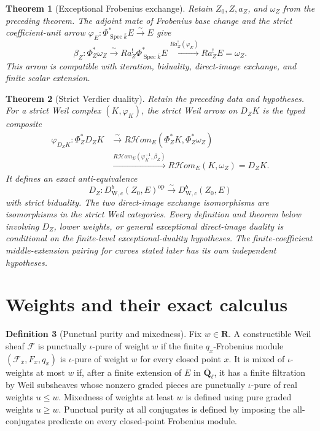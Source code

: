 \documentclass[10pt]{article}
\newtheorem{theorem}{Theorem}[section]
\theoremstyle{definition}
\newtheorem{definition}[theorem]{Definition}
\newcommand{\Qlb}{\overline{\mathbf Q}_\ell}
\newcommand{\DW}{D^b_{\mathrm W,c}}
\newcommand{\Spec}{\operatorname{Spec}}
\begin{document}
\begin{theorem}[Exceptional Frobenius exchange]
Retain \(Z_0,Z,a_Z\), and \(\omega_Z\) from the preceding theorem.  The
adjoint mate of Frobenius base change and
the strict coefficient-unit arrow
\(\varphi_E:\Phi_{\Spec\bar k}^*E\xrightarrow{\sim}E\) give
\[
 \beta_Z:\Phi_Z^*\omega_Z
 \xrightarrow{\sim}Ra_Z^!\Phi_{\Spec\bar k}^*E
 \xrightarrow{Ra_Z^!(\varphi_E)}Ra_Z^!E=\omega_Z.
\]
This arrow is compatible with iteration, biduality, direct-image exchange,
and finite scalar extension.
\end{theorem}

\begin{theorem}[Strict Verdier duality]
Retain the preceding data and hypotheses.  For a strict Weil
complex \((K,\varphi_K)\), the strict Weil arrow on \(D_ZK\) is the typed
composite
\[
\begin{aligned}
 \varphi_{D_ZK}:\Phi_Z^*D_ZK
 &\xrightarrow{\sim}
 R\mathcal Hom_E(\Phi_Z^*K,\Phi_Z^*\omega_Z)\\
 &\xrightarrow{R\mathcal Hom_E(\varphi_K^{-1},\beta_Z)}
 R\mathcal Hom_E(K,\omega_Z)=D_ZK.
\end{aligned}
\]
It defines an exact anti-equivalence
\[
 D_Z:\DW(Z_0,E)^{\mathrm{op}}\xrightarrow{\sim}\DW(Z_0,E)
\]
with strict biduality.  The two direct-image exchange isomorphisms are
isomorphisms in the strict Weil categories.  Every definition and theorem
below involving \(D_Z\), lower weights, or general exceptional direct-image
duality is conditional on the finite-level exceptional-duality hypotheses.
The finite-coefficient middle-extension pairing for curves stated later has
its own independent hypotheses.
\end{theorem}

\section{Weights and their exact calculus}

\begin{definition}[Punctual purity and mixedness]
Fix \(w\in\mathbf R\).  A constructible Weil sheaf \(\mathcal F\) is
punctually \(\iota\)-pure of weight \(w\) if the finite
\(q_x\)-Frobenius module \((\mathcal F_{\bar x},F_x,q_x)\) is
\(\iota\)-pure of weight \(w\) for every closed point \(x\).  It is mixed
of \(\iota\)-weights at most \(w\) if, after a finite extension of \(E\) in
\(\Qlb\), it has a finite filtration by Weil subsheaves whose nonzero
graded pieces are punctually \(\iota\)-pure of real weights \(u\leq w\).
Mixedness of weights at least \(w\) is defined using pure graded weights
\(u\geq w\).  Punctual purity at all conjugates is defined by imposing the
all-conjugates predicate on every closed-point Frobenius module.
\end{definition}
\end{document}
